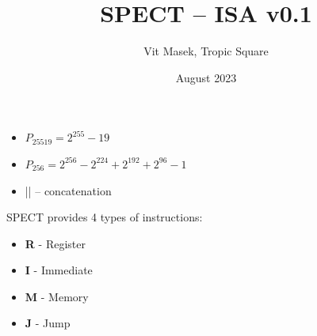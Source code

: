 \documentclass[notconfidential]{tropic_design_spec}
\title{SPECT -- ISA v0.1}
\author{Vit Masek, Tropic Square}
\date{August 2023}
\begin{document}
\def \projectname {SPECT}
\def \documentname {ISA v0.1}
\def \versionnumber {0.1}

\maketitle

\newcommand{\tspar}{\par\vspace{0.5cm}}
\newcommand{\tsspc}{\vspace{0.5cm}}
\newcommand{\tsblank}{\hspace*{0.5cm}}
\newcommand{\bi}[1]{\textbf{\textit{#1}}}

\newcommand{\tsnlind}{\newline\tsblank}

\newcommand{\tsif}{\textbf{\textit{if }}}
\newcommand{\tsthen}{\textbf{\textit{then: }}}
\newcommand{\tselse}{\newline\textbf{\textit{else: }}}



\begin{itemize}
    \item{$P_{25519} = 2^{255} - 19$}
    \item{$P_{256} = 2^{256} - 2^{224} + 2^{192} + 2^{96} - 1$}
    \item{|| -- concatenation}
\end{itemize}



SPECT provides 4 types of instructions:
\begin{itemize}
    \item{\textbf{R} - Register}
    \item{\textbf{I} - Immediate}
    \item{\textbf{M} - Memory}
    \item{\textbf{J} - Jump}
\end{itemize}
\end{document}
